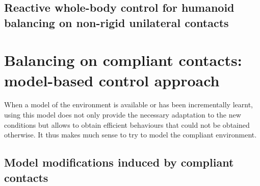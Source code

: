 \documentclass[12pt,a4paper,twoside]{article}
\begin{document}
\subsection{Reactive whole-body control for humanoid balancing on non-rigid unilateral contacts}
\label{app:liu_IROS2015}
\newpage


\section{Balancing on compliant contacts: model-based control approach}

When a model of the environment is available or has been incrementally learnt, using this model does not only provide the necessary adaptation to the new conditions but allows to obtain efficient behaviours that could not be obtained otherwise. It thus makes much sense to try to model the compliant environment.

\subsection{Model modifications induced by compliant contacts}
\end{document}
